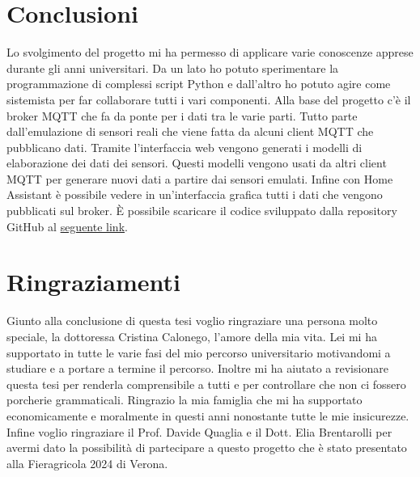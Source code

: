
\chapter*{Conclusioni}

Lo svolgimento del progetto mi ha permesso di applicare varie conoscenze 
apprese durante gli anni universitari.
Da un lato ho potuto sperimentare la programmazione di complessi script Python
e dall'altro ho potuto agire come sistemista per far collaborare tutti i vari componenti.\newline
\newline
Alla base del progetto c'è il broker MQTT che fa da ponte per i dati tra le varie parti.
Tutto parte dall'emulazione di sensori reali che viene fatta da alcuni client MQTT che pubblicano dati.
Tramite l'interfaccia web vengono generati i modelli di elaborazione dei dati dei sensori.
Questi modelli vengono usati da altri client MQTT per generare nuovi dati
a partire dai sensori emulati.
Infine con Home Assistant è possibile vedere in un'interfaccia grafica tutti i dati 
che vengono pubblicati sul broker.\newline
\newline
È possibile scaricare il codice sviluppato dalla repository GitHub
al \href{https://github.com/aletkw00/models_calculator/tree/masterG-python36}{seguente link}.



\chapter*{Ringraziamenti}
Giunto alla conclusione di questa tesi voglio ringraziare una persona molto speciale,
la dottoressa Cristina Calonego, l'amore della mia vita.
Lei mi ha supportato in tutte le varie fasi del mio percorso universitario
motivandomi a studiare e a portare a termine il percorso.
Inoltre mi ha aiutato a revisionare questa tesi per renderla comprensibile a tutti
e per controllare che non ci fossero porcherie grammaticali.
Ringrazio la mia famiglia che mi ha supportato economicamente e moralmente
in questi anni nonostante tutte le mie insicurezze.
Infine voglio ringraziare il Prof. Davide Quaglia e il Dott. Elia Brentarolli per 
avermi dato la possibilità di partecipare a questo progetto 
che è stato presentato alla Fieragricola 2024 di Verona.

